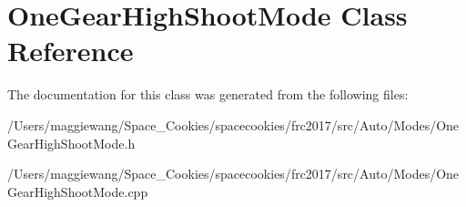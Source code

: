 \hypertarget{class_one_gear_high_shoot_mode}{}\section{One\+Gear\+High\+Shoot\+Mode Class Reference}
\label{class_one_gear_high_shoot_mode}


The documentation for this class was generated from the following files\+:\begin{DoxyCompactItemize}
\item 
/\+Users/maggiewang/\+Space\+\_\+\+Cookies/spacecookies/frc2017/src/\+Auto/\+Modes/One\+Gear\+High\+Shoot\+Mode.\+h\item 
/\+Users/maggiewang/\+Space\+\_\+\+Cookies/spacecookies/frc2017/src/\+Auto/\+Modes/One\+Gear\+High\+Shoot\+Mode.\+cpp\end{DoxyCompactItemize}
